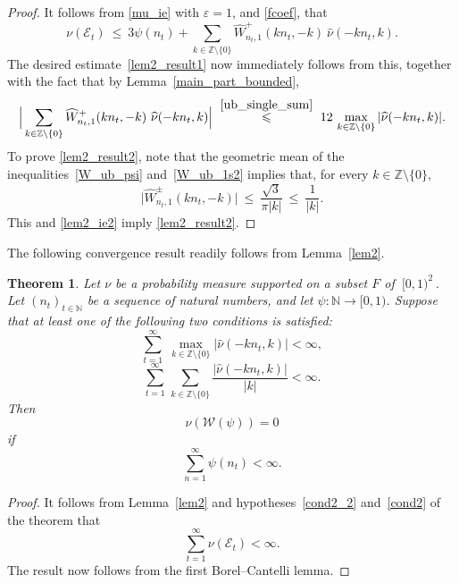 \documentclass[12pt, reqno]{amsart}
\newtheorem{thm}{Theorem}[section]
\theoremstyle{definition}
\theoremstyle{remark}
\numberwithin{equation}{section}
\newcommand{\I}{[0,1)}
\newcommand{\N}{\mathbb{N}}
\def\le{\leqslant} \def\ge{\geqslant}
\def\leq{\leqslant}
\def \bZ {\mathbb Z}
\def \cE {\mathcal E}
\def \cW {\mathcal W}
\begin{document}
\begin{proof}
It follows from \eqref{mu_ie} with $\varepsilon= 1$, and \eqref{fcoef}, that
\begin{equation} \label{lem2_ie2}
\nu(\cE_{t})   \ \le  \  3\psi(n_t)     + \sum_{k \in \bZ \setminus \{0 \}  }\widehat{W}_{n_t,1}^{+}(k n_t, -k)   \  \widehat{\nu}(-k n_t, k).
\end{equation}
The desired estimate~\eqref{lem2_result1} now immediately follows from this, together with the fact that by  Lemma~\ref{main_part_bounded},
\begin{equation*} \label{lem2_ie3}
\Big|\sum_{k \in \bZ \setminus \{0 \}  }\widehat{W}_{n_t,1}^{+}(k n_t, -k)   \  \widehat{\nu}(-k n_t,k)\Big|   \  \stackrel{\eqref{ub_single_sum}}{\leq}  \ 12 \, \max_{k\in\bZ\setminus \{0\} }|\widehat{\nu}(-k n_t,k)|.
\end{equation*}
To prove \eqref{lem2_result2}, note that the geometric mean of the inequalities~\eqref{W_ub_psi} and~\eqref{W_ub_1s2} implies that, for every $k\in\bZ\setminus\{0\}$,
$$
\big|\widehat{W}_{n_t,1}^{\pm}(k n_t,-k)\big|  \ \leq \  \frac{\sqrt{3}}{\pi |k|}    \ \leq \   \frac{1}{|k|}.
$$
This and \eqref{lem2_ie2} imply \eqref{lem2_result2}.
\end{proof}

The following convergence result readily follows from Lemma~\ref{lem2}.

\begin{thm} \label{mainCONV}  Let $\nu$ be a probability  measure supported on a subset $F$ of
$ \ \I^2 \, $.  Let $ (n_t)_{t\in \N} $ be a sequence of natural numbers, and let $\psi:\mathbb{N}\rightarrow \I$. Suppose that at least one of the following two conditions is satisfied:
\begin{equation} \label{cond2_2}
\sum_{t=1}^{\infty} \; \max_{k\in\bZ \setminus \{ 0\} }|\widehat{\nu}(-k n_t,k)|< \infty,
\end{equation}
\begin{equation} \label{cond2}
\sum_{t=1}^{\infty}   \, \sum_{k\in\bZ \setminus
	\{ 0\} }  \frac{|\widehat{\nu}
	(-kn_t,k)|}{|k|}
< \infty .
\end{equation}
Then
\begin{equation*} %
\nu(\cW(\psi))=0  
\end{equation*}
if
\begin{equation} \label{convergence}
\sum\limits_{n=1}^{\infty}\psi(n_t)< \infty.
\end{equation}
\end{thm}
\begin{proof}
It follows from Lemma~\ref{lem2} and hypotheses~\eqref{cond2_2} and~\eqref{cond2} of the theorem that
\[
\sum\limits_{t=1}^{\infty}\nu(\cE_t)<\infty.
\]
The result now follows from the first Borel--Cantelli lemma.
\end{proof}
\end{document}

